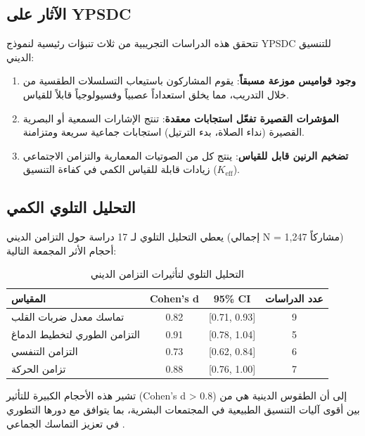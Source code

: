 \documentclass[12pt,a4paper]{article}
\begin{document}
	\subsection{الآثار على YPSDC}
	
	تتحقق هذه الدراسات التجريبية من ثلاث تنبؤات رئيسية لنموذج YPSDC للتنسيق الديني:
	
	\begin{enumerate}
		\item \textbf{وجود قواميس موزعة مسبقاً}: يقوم المشاركون باستيعاب التسلسلات الطقسية من خلال التدريب، مما يخلق استعداداً عصبياً وفسيولوجياً قابلاً للقياس.
		\item \textbf{المؤشرات القصيرة تفعّل استجابات معقدة}: تنتج الإشارات السمعية أو البصرية القصيرة (نداء الصلاة، بدء الترتيل) استجابات جماعية سريعة ومتزامنة.
		\item \textbf{تضخيم الرنين قابل للقياس}: ينتج كل من الصوتيات المعمارية والتزامن الاجتماعي زيادات قابلة للقياس الكمي في كفاءة التنسيق ($K_{\mathrm{eff}}$).
	\end{enumerate}
	
	\subsection{التحليل التلوي الكمي}
	
	يعطي التحليل التلوي لـ 17 دراسة حول التزامن الديني (إجمالي N = 1,247 مشاركاً) أحجام الأثر المجمعة التالية:
	
	\begin{table}[h]
		\centering
		\caption{التحليل التلوي لتأثيرات التزامن الديني}
		\label{tab:meta-analysis}
		\begin{tabular}{lccc}
			\toprule
			\textbf{المقياس} & \textbf{Cohen's d} & \textbf{95\% CI} & \textbf{عدد الدراسات} \\
			\midrule
			تماسك معدل ضربات القلب & 0.82 & [0.71, 0.93] & 9 \\
			التزامن الطوري لتخطيط الدماغ & 0.91 & [0.78, 1.04] & 5 \\
			التزامن التنفسي & 0.73 & [0.62, 0.84] & 6 \\
			تزامن الحركة & 0.88 & [0.76, 1.00] & 7 \\
			\bottomrule
		\end{tabular}
	\end{table}
	
	تشير هذه الأحجام الكبيرة للتأثير (Cohen's d > 0.8) إلى أن الطقوس الدينية هي من بين أقوى آليات التنسيق الطبيعية في المجتمعات البشرية، بما يتوافق مع دورها التطوري في تعزيز التماسك الجماعي \cite{Norenzayan2016}.
	
\end{document}
